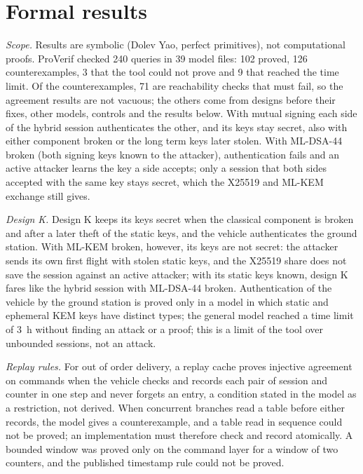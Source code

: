 \documentclass[conference]{IEEEtran}
\begin{document}
\section{Formal results}
\label{sec:formal}
\emph{Scope.} Results are symbolic (Dolev Yao, perfect primitives), not computational proofs. ProVerif checked 240 queries in 39 model files: 102 proved, 126 counterexamples, 3 that the tool could not prove and 9 that reached the time limit. Of the counterexamples, 71 are reachability checks that must fail, so the agreement results are not vacuous; the others come from designs before their fixes, other models, controls and the results below. With mutual signing each side of the hybrid session authenticates the other, and its keys stay secret, also with either component broken or the long term keys later stolen. With ML-DSA-44 broken (both signing keys known to the attacker), authentication fails and an active attacker learns the key a side accepts; only a session that both sides accepted with the same key stays secret, which the X25519 and ML-KEM exchange still gives.

\emph{Design K.} Design K keeps its keys secret when the classical component is broken and after a later theft of the static keys, and the vehicle authenticates the ground station. With ML-KEM broken, however, its keys are not secret: the attacker sends its own first flight with stolen static keys, and the X25519 share does not save the session against an active attacker; with its static keys known, design K fares like the hybrid session with ML-DSA-44 broken. Authentication of the vehicle by the ground station is proved only in a model in which static and ephemeral KEM keys have distinct types; the general model reached a time limit of 3~h without finding an attack or a proof; this is a limit of the tool over unbounded sessions, not an attack.

\emph{Replay rules.} For out of order delivery, a replay cache proves injective agreement on commands when the vehicle checks and records each pair of session and counter in one step and never forgets an entry, a condition stated in the model as a restriction, not derived. When concurrent branches read a table before either records, the model gives a counterexample, and a table read in sequence could not be proved; an implementation must therefore check and record atomically. A bounded window was proved only on the command layer for a window of two counters, and the published timestamp rule could not be proved.
\end{document}
